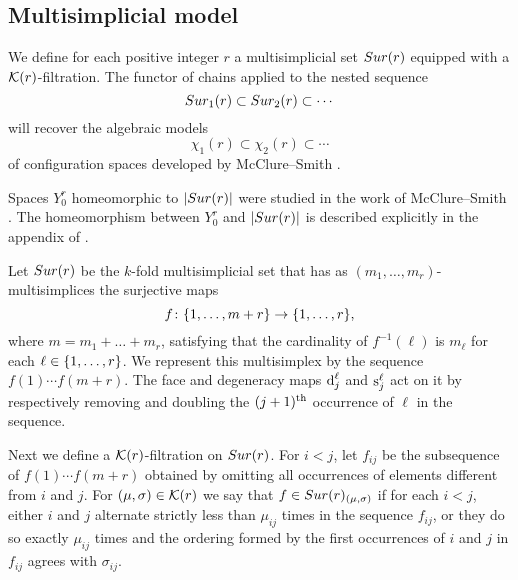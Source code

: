 
\subsection{Multisimplicial model}\label{ss:surjection model}

We define for each positive integer $r$ a multisimplicial set $Sur(r)$ equipped with a $\mathcal{K}(r)$-filtration.
The functor of chains applied to the nested sequence
\[
Sur_{1}(r) \subset Sur_{2}(r) \subset \dotsb
\]
 will recover the algebraic models
\[
\chi_1(r) \subset \chi_2(r) \subset \dotsb
\]
of configuration spaces developed by McClure--Smith \cite{mcluresmith2004geomodel}.

Spaces $Y_0^r$ homeomorphic to $\lvert Sur(r)\rvert$ were studied in the work of McClure--Smith \cite{mcclure2003multivariable}.
The homeomorphism between $Y_0^r$ and $\lvert Sur(r)\rvert$ is described explicitly in the appendix of \cite{salvatore2009deligne}.

Let $Sur(r)$ be the $k$-fold multisimplicial set that has as $(m_1,\dots,m_r)$-multisimplices the surjective maps
\[
f \colon \{1,\dots,m+r\} \to \{1,\dots,r\},
\]
where $m = m_1+\dots+m_r$, satisfying that the cardinality of $f^{-1}(\ell)$ is $m_\ell$ for each $\ell \in \{1,\dots,r\}$.
We represent this multisimplex by the sequence $f(1) \dotsm f(m+r)$.
The face and degeneracy maps $\operatorname{d}^\ell_j$ and $\operatorname{s}^\ell_j$ act on it by respectively removing and doubling the $(j+1)^{\mathrm{th}}$ occurrence of $\ell$ in the sequence.

Next we define a $\mathcal{K}(r)$-filtration on $Sur(r)$.
For $i<j$, let $f_{ij}$ be the subsequence of $f(1) \dotsm f(m+r)$ obtained by omitting all occurrences of elements different from $i$ and $j$.
For $(\mu,\sigma) \in \mathcal{K}(r)$
we say that 
$f \in Sur(r)_{(\mu,\sigma)}$
 if for each $i<j$, either $i$ and $j$ alternate strictly less than $\mu_{ij}$ times in the sequence $f_{ij}$, or they do so exactly $\mu_{ij}$ times and the ordering formed by the first occurrences of $i$ and $j$ in $f_{ij}$ agrees with $\sigma_{ij}$.

